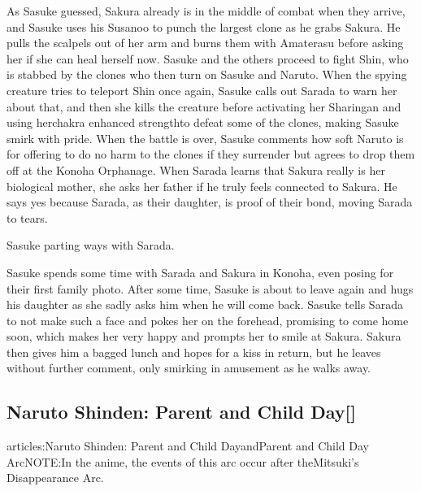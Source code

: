 \documentclass[a4paper,12pt]{article}
\begin{document}
As Sasuke guessed, Sakura already is in the middle of combat when they arrive, and Sasuke uses his Susanoo to punch the largest clone as he grabs Sakura. He pulls the scalpels out of her arm and burns them with Amaterasu before asking her if she can heal herself now. Sasuke and the others proceed to fight Shin, who is stabbed by the clones who then turn on Sasuke and Naruto. When the spying creature tries to teleport Shin once again, Sasuke calls out Sarada to warn her about that, and then she kills the creature before activating her Sharingan and using herchakra enhanced strengthto defeat some of the clones, making Sasuke smirk with pride. When the battle is over, Sasuke comments how soft Naruto is for offering to do no harm to the clones if they surrender but agrees to drop them off at the Konoha Orphanage. When Sarada learns that Sakura really is her biological mother, she asks her father if he truly feels connected to Sakura. He says yes because Sarada, as their daughter, is proof of their bond, moving Sarada to tears.\\ \par \vspace{0.5cm}

Sasuke parting ways with Sarada.\\ \par \vspace{0.5cm}

Sasuke spends some time with Sarada and Sakura in Konoha, even posing for their first family photo. After some time, Sasuke is about to leave again and hugs his daughter as she sadly asks him when he will come back. Sasuke tells Sarada to not make such a face and pokes her on the forehead, promising to come home soon, which makes her very happy and prompts her to smile at Sakura. Sakura then gives him a bagged lunch and hopes for a kiss in return, but he leaves without further comment, only smirking in amusement as he walks away.\\ \par \vspace{0.5cm}

\subsection*{Naruto Shinden: Parent and Child Day[]}\n\nMain articles:Naruto Shinden: Parent and Child DayandParent and Child Day ArcNOTE:In the anime, the events of this arc occur after theMitsuki's Disappearance Arc.\\ \par \vspace{0.5cm}
\end{document}
